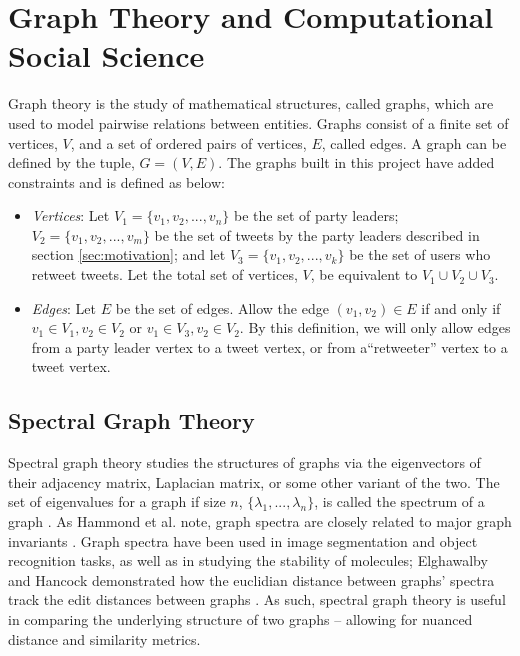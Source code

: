 \chapter{Graph Theory and Computational Social Science}\label{ch:GraphTheory}

Graph theory is the study of mathematical structures, called graphs, which are
used to model pairwise relations between entities. Graphs consist of a finite
set of vertices, $V$, and a set of ordered pairs of vertices, $E$, called edges.
A graph can be defined by the tuple, $G=(V,E)$. The graphs built in this project
have added constraints and is defined as below:

\begin{itemize}
    \item \emph{Vertices}: Let $V_{1}=\{v_{1},v_{2},...,v_{n}\}$ be the set of
    party leaders; $V_{2}=\{v_{1},v_{2},...,v_{m}\}$ be the set of tweets by the
    party leaders described in section \ref{sec:motivation}; and let
    $V_{3}=\{v_{1},v_{2},...,v_{k}\}$ be the set of users who retweet tweets.
    Let the total set of vertices, $V$, be equivalent to $V_{1}\cup V_{2}\cup
    V_{3}$.    
    \item \emph{Edges}: Let $E$ be the set of edges. Allow the edge $(v_{1},
    v_{2})\in E$ if and only if $v_{1}\in V_{1}, v_{2}\in V_{2}$ or $v_{1}\in
    V_{3}, v_{2}\in V_{2}$. By this definition, we will only allow edges from a
    party leader vertex to a tweet vertex, or from a“retweeter” vertex to a
    tweet vertex.
\end{itemize}

\section{Spectral Graph Theory}\label{sec:spectralGraphTheory}

Spectral graph theory studies the structures of graphs via the eigenvectors of
their adjacency matrix, Laplacian matrix, or some other variant of the two. The
set of eigenvalues for a graph if size $n$, $\{\lambda_{1},...,\lambda_{n}\}$,
is called the spectrum of a graph \cite{netlsd}. As Hammond et al. note, graph
spectra are closely related to major graph invariants \cite{chung1997spectral}.
Graph spectra have been used in image segmentation and object recognition tasks,
as well as in studying the stability of molecules; Elghawalby and Hancock
demonstrated how the euclidian distance between graphs' spectra track the edit
distances between graphs \cite{elghawalby2008measuring,chung1997spectral}. As
such, spectral graph theory is useful in comparing the underlying structure of
two graphs -- allowing for nuanced distance and similarity metrics.   

